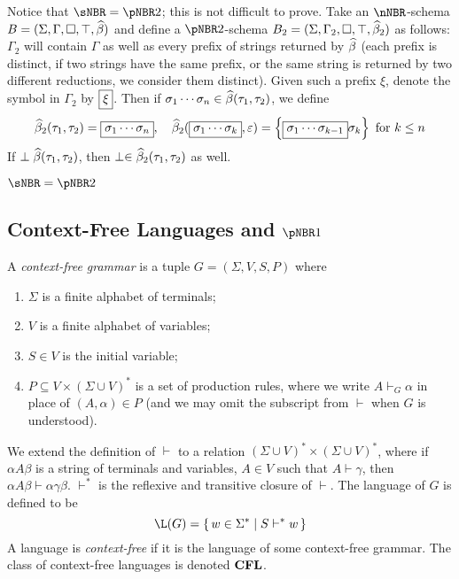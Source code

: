 \documentclass{llncs}
\begin{document}
Notice that $\sNBR=\pNBR2$; this is not difficult to prove.
Take an $\nNBR$-schema $B=(\Sigma,\Gamma,\square,\top,\widehat\beta)$ and define a $\pNBR2$-schema
$B_2=(\Sigma,\Gamma_2,\square,\top,\widehat\beta_2)$ as follows: $\Gamma_2$ will contain $\Gamma$ as well as every prefix of strings
returned by $\widehat\beta$ (each prefix is distinct, if two strings have the same prefix, or the same string is returned by two different
reductions, we consider them distinct).
Given such a prefix $\xi$, denote the symbol in $\Gamma_2$ by $\mbox\xi$.
Then if $\sigma_1\cdots\sigma_n\in\widehat\beta(\tau_1,\tau_2)$, we define
$$ \hb_2(\tau_1,\tau_2) = \mbox{\sigma_1\cdots\sigma_n},\quad
\hb_2(\mbox{\sigma_1\cdots\sigma_k},\epsilon)=\set{\mbox{\sigma_1\cdots\sigma_{k-1}}\sigma_k}\hbox{ for $k\leq n$} $$
If $\perp\widehat\beta(\tau_1,\tau_2)$, then $\perp\in\widehat\beta_2(\tau_1,\tau_2)$ as well.

\begin{lemma}

    $\sNBR=\pNBR2$

\end{lemma}

\subsection{Context-Free Languages and $\pNBR1$}

\begin{definition}

    A \emph{context-free grammar} is a tuple $G=(\Sigma,V,S,P)$ where
    \begin{enumerate}
        \item $\Sigma$ is a finite alphabet of terminals;
        \item $V$ is a finite alphabet of variables;
        \item $S\in V$ is the initial variable;
        \item $P\subseteq V\times(\Sigma\cup V)^*$ is a set of production rules, where we write $A\vdash_G\alpha$ in place of
        $(A,\alpha)\in P$ (and we may omit the subscript from $\vdash$ when $G$ is understood).
    \end{enumerate}
    We extend the definition of $\vdash$ to a relation $(\Sigma\cup V)^*\times(\Sigma\cup V)^*$, where if
    $\alpha A\beta$ is a string of terminals and variables, $A\in V$ such that $A\vdash\gamma$, then
    $\alpha A\beta\vdash\alpha\gamma\beta$.
    $\vdash^*$ is the reflexive and transitive closure of $\vdash$.
    The language of $G$ is defined to be
    $$ \L(G) = \set{w\in\Sigma^*}[S\vdash^*w] $$
    A language is \emph{context-free} if it is the language of some context-free grammar.
    The class of context-free languages is denoted $\hbox{{\bf CFL}}$.

\end{definition}
\end{document}
